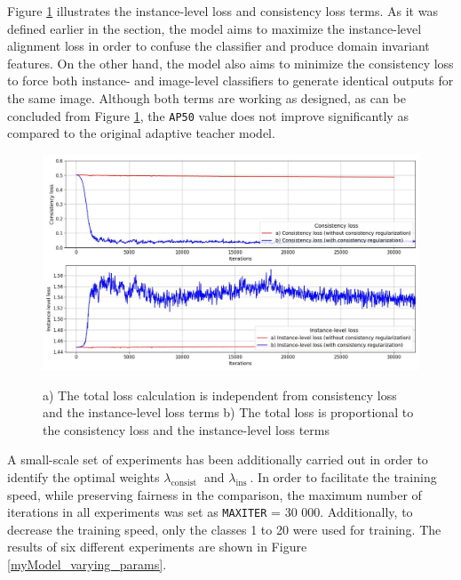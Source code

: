 \documentclass[english, 12pt, a4paper, elec, utf8, a-1b, online]{aaltothesis}
\begin{document}
Figure \ref{myModel_constloss_total} illustrates the instance-level loss and consistency loss terms. As it was defined earlier in the  section, the model aims to maximize the instance-level alignment loss in order to confuse the classifier and produce domain invariant features. On the other hand, the model also aims to minimize the consistency loss to force both instance- and image-level classifiers to generate identical outputs for the same image. Although both terms are working as designed, as can be concluded from Figure \ref{myModel_constloss_total}, the \texttt{AP50} value does not improve significantly as compared to the original adaptive teacher model. 

\begin{figure}[htb]
	\begin{center}
		\includegraphics[width=14cm]{./consistency_loss.jpg}
	\end{center}
	\caption{a) The total loss calculation is independent from consistency loss and the instance-level loss terms b) The total loss is proportional to the consistency loss and the instance-level loss terms}
	\begin{center}
		\label{myModel_constloss_total}
	\end{center}
\end{figure}
\FloatBarrier  

A small-scale set of experiments has been additionally carried out in order to identify the optimal weights $\lambda_{\text {consist }}$ and $\lambda_{\text {ins }}$. In order to facilitate the training speed, while preserving fairness in the  comparison, the maximum number of iterations in all experiments was set as \texttt{MAX\textunderscore ITER} = 30 000. Additionally, to decrease the training speed, only the classes 1 to 20 were used for training. The results of six different experiments are shown in Figure \ref{myModel_varying_params}.
\end{document}
